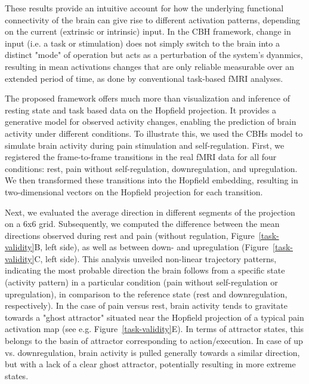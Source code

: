 \documentclass{article}
\begin{document}
These results provide an intuitive account for how the underlying functional connectivity of the brain can give rise to
different activation patterns, depending on the current (extrinsic or intrinsic) input. In the CBH framework, change in
input (i.e. a task or stimulation) does not simply switch to the brain into a distinct "mode" of operation but acts as
a perturbation of the system's dyanmics, resulting in mean activations changes that are only reliable measurable over
an extended period of time, as done by conventional task-based fMRI analyses.

The proposed framework offers much more than visualization and inference of resting state and task based data on the
Hopfield projection. It provides a generative model for observed activity changes, enabling the prediction of brain
activity under different conditions. To illustrate this, we used the CBHs model to simulate brain activity during pain
stimulation and self-regulation. First, we registered the frame-to-frame transitions in the real fMRI data for all four
conditions: rest, pain without self-regulation, downregulation, and upregulation. We then transformed these transitions
into the Hopfield embedding, resulting in two-dimensional vectors on the Hopfield projection for each transition.

Next, we evaluated the average direction in different segments of the projection on a 6x6 grid. Subsequently, we
computed the difference between the mean directions observed during rest and pain (without regulation,
Figure~\ref{task-validity}B, left side), as well as between down- and upregulation (Figure~\ref{task-validity}C, left side).
This analysis unveiled non-linear trajectory patterns, indicating the most probable direction the brain follows from a
specific state (activity pattern) in a particular condition (pain without self-regulation or upregulation), in
comparison to the reference state (rest and downregulation, respectively). In the case of pain versus rest, brain
activity tends to gravitate towards a "ghost attractor" situated near the Hopfield projection of a typical pain
activation map (see e.g. Figure~\ref{task-validity}E). In terms of attractor states, this belongs to the basin of
attractor corresponding to action/execution. In case of up vs. downregulation, brain activity is pulled generally
towards a similar direction, but with a lack of a clear ghost attractor, potentially resulting in more extreme states.
\end{document}
